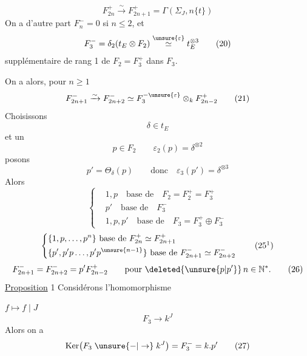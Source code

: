 \[
 F_{2n}^+\xrightarrow{\sim}F_{2n+1}^+=\Gamma(\Sigma_{J},n\{t\}) \tag*{(19)}
\]
On a d'autre part $F_n^-=0$ si $n\leq 2$, et
\[
 F_3^-=\delta_2(t_E\otimes F_2)\overset{\unsure{\varepsilon}}{\simeq}t_E^{\otimes3} \tag*{(20)}
\]
supplémentaire de rang 1 de $F_2=F_3^+$ dans $F_3$.

On a alors, pour  $n\geq1$
\[
 F_{2n+1}^-\xrightarrow{\sim}F_{2n+2}^-\simeq F_3^{-\unsure{\varepsilon}}\otimes_k F_{2n-2}^+ \tag*{(21)}
\]
Choisissons
\[
 \delta\in t_E \tag*{(22)}
\]
et un
\[
 p\in F_2\qquad \varepsilon_2(p)=\delta^{\otimes2} \tag*{(23)}
\]
posons
\[
 p'=\Theta_\delta(p)\qquad\text{donc}\quad \varepsilon_3(p')=\delta^{\otimes3} \tag*{(24)}
\]
Alors
\[
 \left\{\begin{aligned}
 &1,p\quad\text{base de}\quad F_2=F_2^+=F_3^+\\
 &p'\quad\text{base de}\quad F_3^-\\
 &1,p,p'\quad\text{base de}\quad F_3=F_3^+\oplus F_3^-
 \end{aligned}\right. \tag*{(25)}
\]
\[
 \left\{\begin{aligned}
 &\{1,p,\ldots,p^n\}\ \text{base de}\ F_{2n}^+\simeq F_{2n+1}^+\\
 &\{p',p'p\ldots,p'p^{\unsure{n-1}}\}\ \text{base de}\ F_{2n+1}^-\simeq F_{2n+2}^-
 \end{aligned}\right. \tag*{$(25^1)$}
\]
\[
 F_{2n+1}^-=F_{2n+2}^-=p'F_{2n-2}^+\qquad\text{pour }\deleted{\unsure{p|p'}}\,n\in\mathbb N^*. \tag*{(26)}
\]
\uline{Proposition} 1 Considérons l'homomorphisme

$f\longmapsto f\mid J$
\[
 F_3\longrightarrow k^J
\]
Alors on a
\[
 \operatorname{Ker}\bigl(F_3\mathrel{\unsure{-|\to}} k^J\bigr)=F_3^-=k.p' \tag*{(27)}
\]
